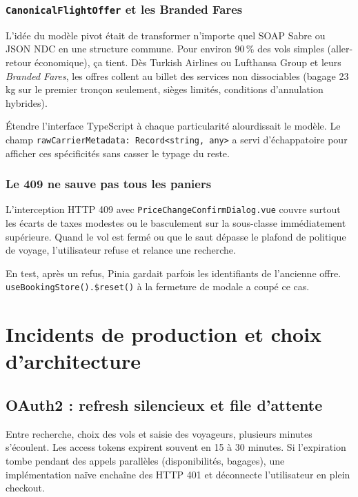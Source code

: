 \subsection{\texttt{CanonicalFlightOffer} et les Branded Fares}

L'idée du modèle pivot était de transformer n'importe quel SOAP Sabre ou JSON NDC en une structure commune. Pour environ 90\,\% des vols simples (aller-retour économique), ça tient. Dès Turkish Airlines ou Lufthansa Group et leurs \textit{Branded Fares}, les offres collent au billet des services non dissociables (bagage 23\,kg sur le premier tronçon seulement, sièges limités, conditions d'annulation hybrides).

Étendre l'interface TypeScript à chaque particularité alourdissait le modèle. Le champ \texttt{rawCarrierMetadata: Record<string, any>} a servi d'échappatoire pour afficher ces spécificités sans casser le typage du reste.

\subsection{Le 409 ne sauve pas tous les paniers}

L'interception HTTP 409 avec \texttt{PriceChangeConfirmDialog.vue} couvre surtout les écarts de taxes modestes ou le basculement sur la sous-classe immédiatement supérieure. Quand le vol est fermé ou que le saut dépasse le plafond de politique de voyage, l'utilisateur refuse et relance une recherche.

En test, après un refus, Pinia gardait parfois les identifiants de l'ancienne offre. \texttt{useBookingStore().\$reset()} à la fermeture de modale a coupé ce cas.

\chapter{Incidents de production et choix d'architecture}
\label{chap:bilan_critique_technique}

\section{OAuth2 : refresh silencieux et file d'attente}

Entre recherche, choix des vols et saisie des voyageurs, plusieurs minutes s'écoulent. Les access tokens expirent souvent en 15 à 30 minutes. Si l'expiration tombe pendant des appels parallèles (disponibilités, bagages), une implémentation naïve enchaîne des HTTP 401 et déconnecte l'utilisateur en plein checkout.

